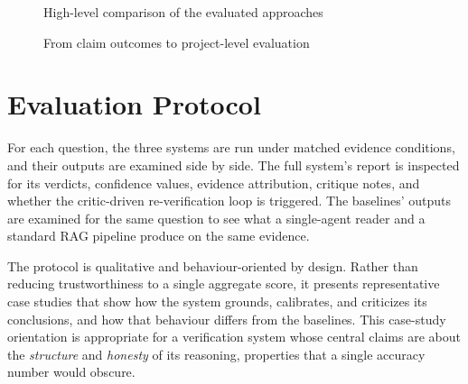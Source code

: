 \begin{figure}[!htbp]
\centering
{}
\caption{High-level comparison of the evaluated approaches}
\label{fig:approach_comparison}
\end{figure}

\begin{figure}[!htbp]
\centering
{}
\caption{From claim outcomes to project-level evaluation}
\label{fig:metrics_flow}
\end{figure}

\section{Evaluation Protocol }

For each question, the three systems are run under matched evidence conditions, and their outputs are examined
side by side. The full system's report is inspected for its verdicts, confidence values, evidence attribution,
critique notes, and whether the critic-driven re-verification loop is triggered. The baselines' outputs are
examined for the same question to see what a single-agent reader and a standard RAG pipeline produce on the same
evidence.

The protocol is qualitative and behaviour-oriented by design. Rather than reducing trustworthiness to a single
aggregate score, it presents representative case studies that show how the system grounds, calibrates, and
criticizes its conclusions, and how that behaviour differs from the baselines. This case-study orientation is
appropriate for a verification system whose central claims are about the \emph{structure} and \emph{honesty} of its
reasoning, properties that a single accuracy number would obscure.

